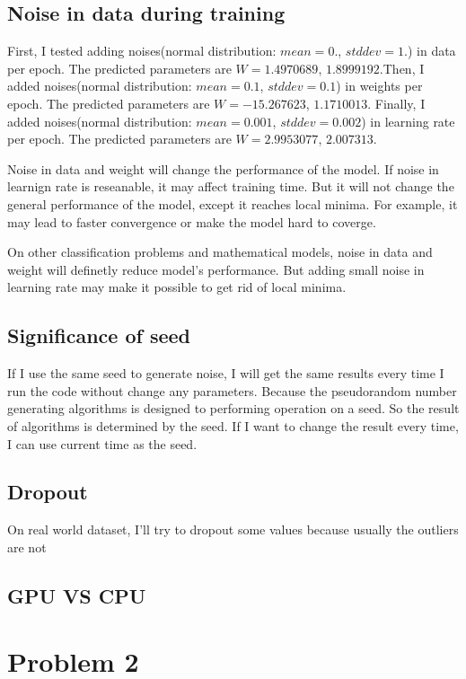 \documentclass{article}
\begin{document}
\subsection{Noise in data during training}
First, I tested adding noises(normal distribution: $mean = 0.$, $stddev=1.$) in data per epoch. The predicted parameters are $W = 1.4970689$, $1.8999192$.Then, I added noises(normal distribution: $mean = 0.1$, $stddev=0.1$) in weights per epoch. The predicted parameters are $W = -15.267623$, $1.1710013$. Finally, I added noises(normal distribution: $mean = 0.001$, $stddev=0.002$) in learning rate per epoch. The predicted parameters are $W = 2.9953077$, $2.007313$. 

Noise in data and weight will change the performance of the model. If noise in learnign rate is reseanable, it may affect training time. But it will not change the general performance of the model, except it reaches local minima. For example, it may lead to faster convergence or make the model hard to coverge. 

On other classification problems and mathematical models, noise in data and weight will definetly reduce model's performance. But adding small noise in learning rate may make it possible to get rid of local minima.  

\subsection{Significance of seed}
If I use the same seed to generate noise, I will get the same results every time I run the code without change any parameters. Because the pseudorandom number generating algorithms is designed to performing operation on a seed. So the result of algorithms is determined by the seed. If I want to change the result every time, I can use current time as the seed.

\subsection{Dropout}
On real world dataset, I'll try to dropout some values because usually the outliers are not 

\subsection{GPU VS CPU}

\section{Problem 2}
\end{document}

